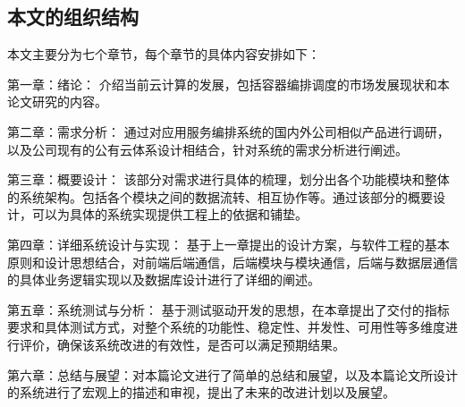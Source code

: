 \subsection{本文的组织结构}
本文主要分为七个章节，每个章节的具体内容安排如下：

第一章：绪论： 介绍当前云计算的发展，包括容器编排调度的市场发展现状和本论文研究的内容。

第二章：需求分析： 通过对应用服务编排系统的国内外公司相似产品进行调研，以及公司现有的公有云体系设计相结合，针对系统的需求分析进行阐述。

第三章：概要设计： 该部分对需求进行具体的梳理，划分出各个功能模块和整体的系统架构。包括各个模块之间的数据流转、相互协作等。通过该部分的概要设计，可以为具体的系统实现提供工程上的依据和铺垫。

第四章：详细系统设计与实现： 基于上一章提出的设计方案，与软件工程的基本原则和设计思想结合，对前端后端通信，后端模块与模块通信，后端与数据层通信的具体业务逻辑实现以及数据库设计进行了详细的阐述。

第五章：系统测试与分析： 基于测试驱动开发的思想，在本章提出了交付的指标要求和具体测试方式，对整个系统的功能性、稳定性、并发性、可用性等多维度进行评价，确保该系统改进的有效性，是否可以满足预期结果。

第六章：总结与展望：对本篇论文进行了简单的总结和展望，以及本篇论文所设计的系统进行了宏观上的描述和审视，提出了未来的改进计划以及展望。


